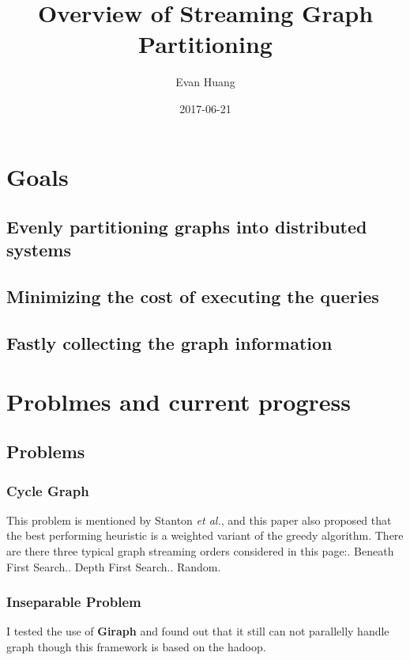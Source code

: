 \documentclass{article}
\title{Overview of Streaming Graph Partitioning}
\date{2017-06-21}
\author{Evan Huang}
\begin{document}
	\maketitle

	\newpage

	\tableofcontents


	\newpage
	\section{Goals}
	\subsection{Evenly partitioning graphs into distributed systems}
	\subsection{Minimizing the cost of executing the queries}
	\subsection{Fastly collecting the graph information}

	\newpage
	\section{Problmes and current progress}
	\subsection{Problems}
	\subsubsection{Cycle Graph}
	This problem is mentioned by Stanton \emph{et al.}\cite{stanton2012streaming}, and this paper also proposed that the best performing heuristic is a weighted variant of the greedy algorithm. There are there three typical graph streaming orders considered in this page:. Beneath First Search.. Depth First Search.. Random.\newline

	\subsubsection{Inseparable Problem}
	I tested the use of \textbf{Giraph}\cite{giraph} and found out that it still can not parallelly handle graph though this framework is based on the hadoop\cite{hadoop}.
\end{document}

